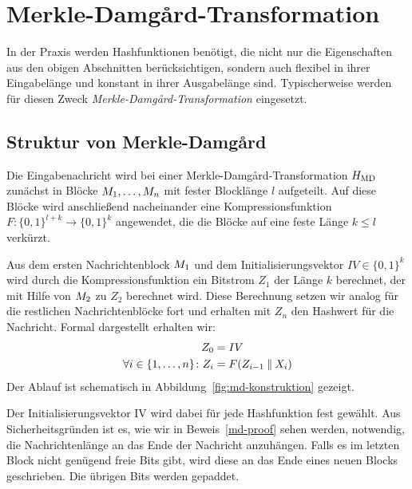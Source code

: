\section{Merkle-Damgård-Transformation}
\label{ch:hash:merkledamgard}
In der Praxis werden Hashfunktionen benötigt, die nicht nur die Eigenschaften aus den obigen Abschnitten berücksichtigen, sondern auch flexibel in ihrer
Eingabelänge und konstant in ihrer Ausgabelänge sind. Typischerweise werden für diesen Zweck \emph{Merkle-Damgård-Transformation} eingesetzt. 

\subsection{Struktur von Merkle-Damgård}
Die Eingabenachricht wird bei einer Merkle-Damgård-Transformation $H_{\textnormal{MD}}$ zunächst in Blöcke $M_{1},\dots, M_{n}$ mit fester Blocklänge $l$ aufgeteilt.
Auf diese Blöcke wird anschließend nacheinander eine Kompressionsfunktion $F \colon \{0, 1\}^{l + k} \rightarrow \{0,1\}^{k}$ angewendet, die %
die Blöcke auf eine feste Länge $k \leq l$ verkürzt.

Aus dem ersten Nachrichtenblock $M_{1}$ und dem Initialisierungsvektor $IV \in \{0, 1\}^k$  wird durch die Kompressionsfunktion ein Bitstrom $Z_1$ der Länge $k$
berechnet, der mit Hilfe von $M_2$ zu $Z_2$ berechnet wird. Diese Berechnung setzen wir analog für die restlichen Nachrichtenblöcke fort und erhalten mit $Z_{n}$ den Hashwert für die Nachricht. Formal dargestellt erhalten wir:
\begin{align*}
	Z_0 &= IV\\
	\forall i \in \{1,\dots, n\}\colon Z_{i} &= F(Z_{i-1} \mathbin{\|} X_{i})
\end{align*}
Der Ablauf ist schematisch in Abbildung~\ref{fig:md-konstruktion} gezeigt.

Der Initialisierungsvektor IV wird dabei für jede Hashfunktion fest gewählt. Aus Sicherheitsgründen ist es, wie wir in Beweis~\ref{md-proof} sehen werden, notwendig, die Nachrichtenlänge an das Ende der Nachricht anzuhängen. Falls es im letzten Block nicht genügend freie Bits gibt, wird diese an das Ende eines neuen Blocks geschrieben. Die übrigen Bits werden gepaddet.

